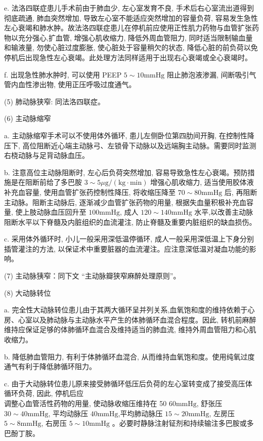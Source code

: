 \documentclass[10pt]{article}
\begin{document}
e. 法洛四联症患儿手术前由于肺血少, 左心室发育不良, 手术后右心室流出道得到彻底疏通, 肺血突然增加, 导致左心室不能适应突然增加的容量负荷, 容易发生急性左心衰竭和肺水肿。故法洛四联症患儿在停机前应使用正性肌力药物与血管扩张药物以充分强心,扩血管, 增强心肌收缩力, 降低外周血管阻力, 同时适当限制输血量和输液量, 勿使心脏过度膨胀, 使心脏处于容量稍欠的状态, 降低心脏的前负荷以免停机后出现急性左心衰竭。此处理方法同样适用于出现右心衰竭或全心衰竭时。

f. 出现急性肺水肿时, 可以使用 PEEP $5 \sim 10 \mathrm{mmHg}$ 阻止肺泡液渗漏, 间断吸引气管内血性渗出物, 使用正压呼吸过度通气。

(5) 肺动脉狭窄: 同法洛四联症。

(6) 主动脉缩窄

a. 主动脉缩窄手术可以不使用体外循环, 患儿左侧卧位第四肋间开胸, 在控制性降压下, 高位阻断近心端主动脉弓、左锁骨下动脉以及远端胸主动脉。需要同时监测右桡动脉与足背动脉血压。

b. 注意高位主动脉阻断时, 左心后负荷突然增加, 容易导致急性左心衰竭。预防措施是在阻断前给了多巴胺 $3 \sim 5 \mu \mathrm{g} /(\mathrm{kg} \cdot \mathrm{min})$ 增强心肌收缩力, 适当使用胶体液补充血容量, 使用血管扩张药控制性降压, 将收缩压降至 $70 \sim 80 \mathrm{mmHg}$ 后, 再阻断主动脉。阻断主动脉后, 逐渐减少血管扩张药物的用量, 根据失血量积极补充血容量, 使上肢动脉血压回升至 $100 \mathrm{mmHg}$, 成人 $120 \sim 140 \mathrm{mmHg}$ 水平,以改善主动脉阻断水平以下脊髓及内脏组织的血流灌注, 防止脊髓及重要内脏组织的缺血损伤。

c. 采用体外循环时, 小儿一般采用深低温停循环, 成人一般采用深低温上下身分别插管灌注的方法, 以保证术中重要脏器的血流灌注。应注意深低温对凝血功能的影响。

(7) 主动脉㹫窄：同下文 “主动脉瓣狭窄麻醉处理原则”。

(8) 大动脉转位

a. 完全性大动脉转位患儿由于其两大循环呈并列关系,血氧饱和度的维持依赖于心房、心室以及肺动脉与主动脉水平产生的体肺循环血混合程度。因此, 转机前麻醉维持应保证足够的体肺循环血混合及维持适当的肺血流, 维持外周血管阻力和心肌收缩力。

b. 降低肺血管阻力, 有利于体肺循环血混合, 从而维持血氧饱和度。使用纯氧过度通气有利于降低肺循环阻力。

c. 由于大动脉转位患儿原来接受肺循环低压后负荷的左心室转变成了接受高压体循环负荷, 因此, 停机后应\\
调整心血管活性药物的用量, 使动脉收缩压维持在 50 $60 \mathrm{mmHg}$, 舒张压 $30 \sim 40 \mathrm{mmHg}$, 平均动脉压 $40 \mathrm{mmHg}$,平均肺动脉压 $15 \sim 20 \mathrm{mmHg}$, 左房压 $5 \sim 8 \mathrm{mmHg}$, 右房压 $5 \sim 10 \mathrm{mmHg}$ 。必要时静脉注射钲剂和持续输注多巴胺或多巴酚丁胺。
\end{document}
